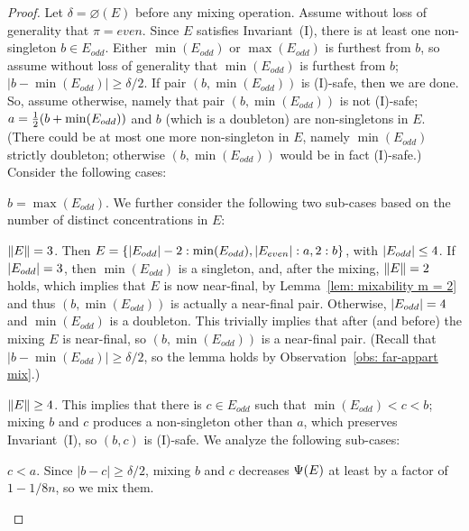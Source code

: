 \begin{proof}
	Let $\delta=\diameter(E)$ before any mixing operation.
	Assume without loss of generality that $\pi=even$.
	Since $E$ satisfies Invariant~(I), there is at least one non-singleton $b\in E_{odd}$.
	Either $\min(E_{odd})$ or $\max(E_{odd})$ is furthest from $b$, so
	assume without loss of generality that $\min(E_{odd})$ is furthest from $b$; 
	$|b-\min(E_{odd})|\geq\delta/2$.	
	If pair $(b,\min(E_{odd}))$ is (I)-safe, then we are done.
	So, assume otherwise, namely that pair $(b,\min(E_{odd}))$ is not (I)-safe;
	$a={\textstyle\frac{1}{2}}(b+\min(E_{odd}))$ and $b$ (which is a doubleton) are non-singletons in $E$.
	(There could be at most one more non-singleton in $E$, namely $\min(E_{odd})$ strictly doubleton;
	otherwise $(b,\min(E_{odd}))$ would be in fact (I)-safe.)
	Consider the following cases:
	
	\medskip\noindent{} $b = \max(E_{odd})$.
	We further consider the following two sub-cases based on the number
	of distinct concentrations in $E$:
	\begin{description}
		\item{} ${\|E\|}=3$.
		Then $E={ \left\{ {|E_{odd}|}-2:\min(E_{odd}),{|E_{even}|}:a,2:b \right\} }$,
		with ${|E_{odd}|}\leq 4$.
		If ${|E_{odd}|}=3$, then $\min(E_{odd})$ is a singleton, and, 
		after the mixing, ${\|E\|}=2$ holds,
		which implies that $E$ is now near-final, by Lemma~\ref{lem: mixability m = 2}
		and thus $(b,\min(E_{odd}))$ is actually a near-final pair.		
		Otherwise, ${|E_{odd}|}=4$ and $\min(E_{odd})$ is a doubleton.
		This trivially implies that after (and before) the mixing $E$ is near-final,
		so $(b,\min(E_{odd}))$ is a near-final pair.
		(Recall that $|b-\min(E_{odd})|\geq\delta/2$, so the lemma holds
		by Observation~\ref{obs: far-appart mix}.)
				
		
		\item{} ${\|E\|}\geq 4$.
		This implies that there is $c\in E_{odd}$ such that $\min(E_{odd})<c<b$;
		mixing $b$ and $c$ produces a non-singleton other than $a$,
		which preserves Invariant~(I), so $(b,c)$ is (I)-safe.
		We analyze the following sub-cases:
		\begin{description}
			\vspace{-0.03in}
			\item{} $c<a$.
			Since $|b-c|\geq\delta/2$, mixing $b$ and $c$ decreases ${\Psi}(E)$ 
			at least by a factor of $1-1/8n$, so we mix them.
			

\end{description}
\end{description}
\end{proof}
